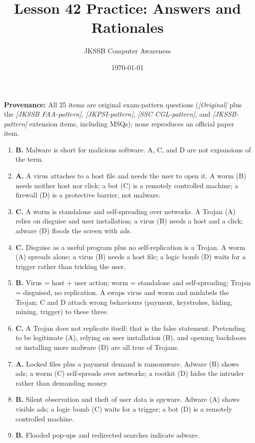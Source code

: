 \documentclass[11pt]{article}
\title{Lesson 42 Practice: Answers and Rationales}
\author{JKSSB Computer Awareness}
\date{\today}
\begin{document}
\maketitle
\noindent\textbf{Provenance:} All 25 items are original exam-pattern questions (\textit{[Original]} plus the \textit{[JKSSB FAA-pattern]}, \textit{[JKPSI-pattern]}, \textit{[SSC CGL-pattern]}, and \textit{[JKSSB-pattern]} extension items, including MSQs); none reproduces an official paper item.
\begin{enumerate}[label=\textbf{Q\arabic*.}, leftmargin=*]
\item \textbf{B.} Malware is short for malicious software. A, C, and D are
  not expansions of the term.
\item \textbf{A.} A virus attaches to a host file and needs the user to open
  it. A worm (B) needs neither host nor click; a bot (C) is a remotely
  controlled machine; a firewall (D) is a protective barrier, not malware.
\item \textbf{C.} A worm is standalone and self-spreading over networks. A
  Trojan (A) relies on disguise and user installation; a virus (B) needs a
  host and a click; adware (D) floods the screen with ads.
\item \textbf{C.} Disguise as a useful program plus no self-replication is a
  Trojan. A worm (A) spreads alone; a virus (B) needs a host file; a logic
  bomb (D) waits for a trigger rather than tricking the user.
\item \textbf{B.} Virus = host + user action; worm = standalone and
  self-spreading; Trojan = disguised, no replication. A swaps virus and worm
  and mislabels the Trojan; C and D attach wrong behaviours (payment,
  keystrokes, hiding, mining, trigger) to these three.
\item \textbf{C.} A Trojan does not replicate itself; that is the false
  statement. Pretending to be legitimate (A), relying on user installation
  (B), and opening backdoors or installing more malware (D) are all true of
  Trojans.
\item \textbf{A.} Locked files plus a payment demand is ransomware. Adware
  (B) shows ads; a worm (C) self-spreads over networks; a rootkit (D) hides
  the intruder rather than demanding money.
\item \textbf{B.} Silent observation and theft of user data is spyware.
  Adware (A) shows visible ads; a logic bomb (C) waits for a trigger; a bot
  (D) is a remotely controlled machine.
\item \textbf{B.} Flooded pop-ups and redirected searches indicate adware.

\end{enumerate}
\end{document}
